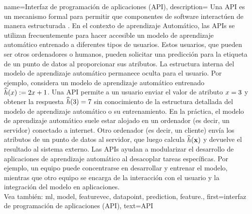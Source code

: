 {name={Interfaz de programación de aplicaciones (API)},
		description={
			Una  API es un mecanismo formal para permitir 
			que componentes de software interactúen de manera estructurada \cite{RestfulBook2013}. En el 
			contexto de aprendizaje Automático, las APIs se utilizan frecuentemente para hacer accesible un modelo de aprendizaje automático 
			entrenado a diferentes tipos de usuarios. Estos usuarios, que pueden ser otros ordenadores 
			o humanos, pueden solicitar una predicción para la etiqueta de un punto de datos al 
			proporcionar sus atributos. La estructura interna del modelo de  aprendizaje automático
		 permanece oculta para el usuario. Por ejemplo, considera un modelo de aprendizaje automático 
			entrenado $\widehat{h}(x) := 2 x+1$. Una API permite a un usuario 
			enviar el valor de atributo $x=3$ y obtener la respuesta $\widehat{h}(3)=7$ 
			sin conocimiento de la estructura detallada del modelo de aprendizaje automático o su entrenamiento. 
			En la práctica, el modelo de aprendizaje automático suele estar alojado en un ordenador (es decir, un servidor) conectado a internet. 
			Otro ordenador (es decir, un cliente) envía los atributos de un punto de datos al 
			servidor, que luego calcula $\widehat{h}({\bf x})$ y devuelve el 
			resultado al sistema externo. Las APIs ayudan a modularizar el desarrollo de 
			aplicaciones de aprendizaje automático al desacoplar tareas específicas. Por ejemplo, un equipo puede 
			concentrarse en desarrollar y entrenar el modelo, mientras que otro equipo se encarga 
			de la interacción con el usuario y la integración del modelo en aplicaciones.
			\\
			Vea también: \gls{ml}, \gls{model}, \gls{featurevec}, \gls{datapoint}, \gls{prediction}, \gls{feature}.},
		first={interfaz de programación de aplicaciones (API)},
		text={API}
}

